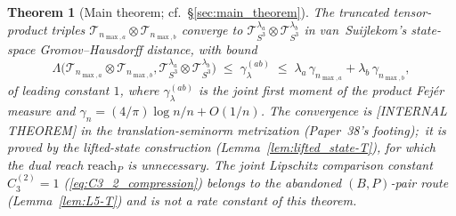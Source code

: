 \documentclass[11pt,a4paper]{article}
\theoremstyle{plain}
\newtheorem{theorem}{Theorem}[section]
\theoremstyle{definition}
\newcommand{\nmaxa}{n_{\max,a}}
\newcommand{\nmaxb}{n_{\max,b}}
\newcommand{\sthree}{S^{3}}
\newcommand{\Tcal}{\mathcal{T}}
\begin{document}
\begin{theorem}[Main theorem; cf.~\S\ref{sec:main_theorem}]
\label{thm:main_intro}
The truncated tensor-product triples $\Tcal_{\nmaxa} \otimes
\Tcal_{\nmaxb}$ converge to $\Tcal_{\sthree}^{\lambda_a} \otimes
\Tcal_{\sthree}^{\lambda_b}$ in van~Suijlekom's state-space
Gromov--Hausdorff distance, with bound
\begin{equation}\label{eq:main_rate_intro}
   \Lambda\bigl(\Tcal_{\nmaxa} \otimes \Tcal_{\nmaxb},
                \Tcal_{\sthree}^{\lambda_a} \otimes
                \Tcal_{\sthree}^{\lambda_b}\bigr)
   \;\le\; \gamma^{(ab)}_\lambda
   \;\le\; \lambda_a\,\gamma_{\nmaxa} + \lambda_b\,\gamma_{\nmaxb},
\end{equation}
of leading constant $1$, where $\gamma^{(ab)}_\lambda$ is the joint first
moment of the product Fej\'er measure and $\gamma_n = (4/\pi)\log n/n +
O(1/n)$. The convergence is [INTERNAL THEOREM] in the translation-seminorm
metrization (Paper~38's footing);\ it is proved by the lifted-state
construction (Lemma~\ref{lem:lifted_state-T}), for which the dual reach
$\mathrm{reach}_P$ is unnecessary. The joint Lipschitz comparison constant
$C_3^{(2)} = 1$ (\eqref{eq:C3_2_compression}) belongs to the \emph{abandoned}
$(B,P)$-pair route (Lemma~\ref{lem:L5-T}) and is not a rate constant of this
theorem.
\end{theorem}
\end{document}

